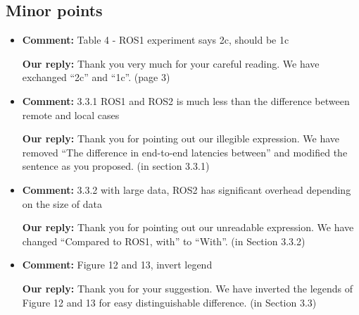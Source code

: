 \documentclass{article}
\begin{document}
\subsection{Minor points}
\begin{itemize}

\item \begin{flushleft}
  \textbf{Comment:} Table 4 - ROS1 experiment says 2c, should be 1c
\end{flushleft}

  \begin{flushleft}
    \textbf{Our reply:} Thank you very much for your careful reading. We have exchanged ``2c'' and ``1c''. (page 3)
  \end{flushleft}

\item \begin{flushleft}
  \textbf{Comment:} 3.3.1 ROS1 and ROS2 is much less than the difference between remote and local cases
\end{flushleft}

  \begin{flushleft}
    \textbf{Our reply:} Thank you for pointing out our illegible expression. We have removed ``The difference in end-to-end latencies between'' and modified the sentence as you proposed. (in section 3.3.1)
  \end{flushleft}

\item \begin{flushleft}
  \textbf{Comment:} 3.3.2 with large data, ROS2 has significant overhead depending on the size of data
\end{flushleft}

  \begin{flushleft}
    \textbf{Our reply:} Thank you for pointing out our unreadable expression. We have changed ``Compared to ROS1, with'' to ``With''. (in Section 3.3.2)
  \end{flushleft}

\item \begin{flushleft}
  \textbf{Comment:} Figure 12 and 13, invert legend
\end{flushleft}

  \begin{flushleft}
    \textbf{Our reply:} Thank you for your suggestion. We have inverted the legends of Figure 12 and 13 for easy distinguishable difference. (in Section 3.3)
  \end{flushleft}


\end{itemize}
\end{document}
